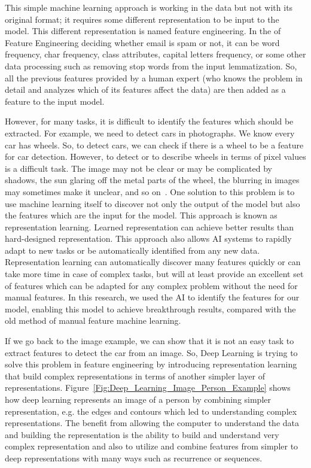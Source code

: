 This simple machine learning approach is working in the data but not with its original format; it requires some different representation to be input to the model. This different representation is named feature engineering. In the of Feature Engineering deciding whether email is spam or not, it can be word frequency, char frequency, class attributes, capital letters frequency, or some other data processing such as removing stop words from the input lemmatization. So, all the previous features provided by a human expert (who knows the problem in detail and analyzes which of its features affect the data) are then added as a feature to the input model.
   

However, for many tasks, it is difficult to identify the features which should be extracted. For example, we need to detect cars in photographs. We know every car has wheels. So, to detect cars, we can check if there is a wheel to be a feature for car detection. However, to detect or to describe wheels in terms of pixel values is a difficult task. The image may not be clear or may be complicated by shadows, the sun glaring off the metal parts of the wheel, the blurring in images may sometimes make it unclear, and so on~\cite{Goodfellow-et-al-2016}. One solution to this problem is to use machine learning itself to discover not only the output of the model but also the features which are the input for the model. This approach is known as representation learning. Learned representation can achieve better results than hard-designed representation. This approach also allows AI systems to rapidly adapt to new tasks or be automatically identified from any new data. Representation learning can automatically discover many features quickly or can take more time in case of complex tasks, but will at least provide an excellent set of features which can be adapted for any complex problem without the need for manual features. In this research, we used the AI to identify the features for our model, enabling this model to achieve breakthrough results, compared with the old method of manual feature machine learning.

If we go back to the image example, we can show that it is not an easy task to extract features to detect the car from an image. So, Deep Learning is trying to solve this problem in feature engineering by introducing representation learning that build complex representations in terms of another simpler layer of representations. Figure~\ref{Fig:Deep_Learning_Image_Person_Example} shows how deep learning represents an image of a person by combining simpler representation, e.g. the edges and contours which led to understanding complex representations. The benefit from allowing the computer to understand the data and building the representation is the ability to build and understand very complex representation and also to utilize and combine features from simpler to deep representations with many ways such as recurrence or sequences.

